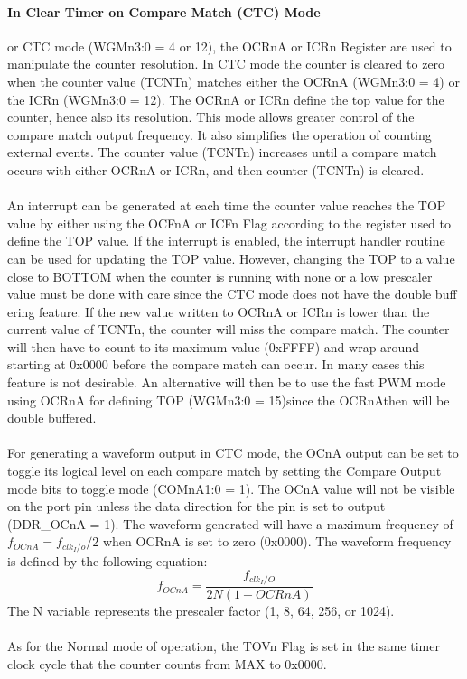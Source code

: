 \documentclass[english]{article}
\begin{document}
\paragraph{In Clear Timer on Compare Match (CTC) Mode}  or CTC mode (WGMn3:0 = 4 or 12), the OCRnA or ICRn Register are used to manipulate the counter resolution. In CTC mode the counter is cleared to zero when the counter value (TCNTn) matches either the OCRnA (WGMn3:0 = 4) or the ICRn (WGMn3:0 =
12). The OCRnA or ICRn define the top value for the counter, hence also its resolution. This mode allows greater control of the compare match output frequency. It also simplifies the operation of counting external events. The counter value (TCNTn) increases until a compare match occurs with either OCRnA or ICRn, and then counter (TCNTn) is cleared.\\\\
An interrupt can be generated at each time the counter value reaches the TOP value by either using the OCFnA or ICFn Flag according to the register used to define the TOP value. If the interrupt is enabled, the interrupt handler routine can be used for updating the TOP value. However, changing the TOP to a value close to BOTTOM when the counter is running with none or a low prescaler value must be done with care since the CTC mode does not have the double buff ering feature. If the new value written to OCRnA or ICRn is lower than the current value of TCNTn, the counter will miss the compare match. The counter will then have to count to its maximum value (0xFFFF) and wrap around starting at 0x0000 before the compare match can occur. In many cases this feature is not desirable. An alternative will then be to use the fast PWM mode using OCRnA for defining TOP (WGMn3:0 = 15)since the OCRnAthen will be double buffered.\\\\
For generating a waveform output in CTC mode, the OCnA output can be set to toggle its logical
level on each compare match by setting the Compare Output mode bits to toggle mode (COMnA1:0 = 1). The OCnA value will not be visible on the port pin unless the data direction for the pin is set to output (DDR\_OCnA = 1). The waveform generated will have a maximum frequency of $f_{OCnA}=f_{clk_I/o}/2$ when OCRnA is set to zero (0x0000). The waveform frequency is defined by the following equation:
$$
f_{OCnA}=\frac{f_{clk_I/O}}{2N(1+OCRnA)}
$$
The N variable represents the prescaler factor (1, 8, 64, 256, or 1024).\\\\
As for the Normal mode of operation, the TOVn Flag is set in the same timer clock cycle that the
counter counts from MAX to 0x0000.
\end{document}
